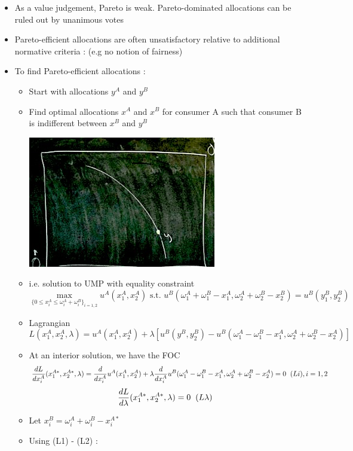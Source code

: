 \documentclass[twoside]{article}
\begin{document}
\begin{itemize}
\item As a value judgement, Pareto is weak. Pareto-dominated allocations can be ruled out by unanimous votes
\item Pareto-efficient allocations are often unsatisfactory relative to additional normative criteria : (e.g no notion of fairness)
\item To find Pareto-efficient allocations :
\begin{itemize}
\item Start with allocations \(y^A\) and \(y^B\)
\item Find optimal allocations \(x^A\) and  \(x^B\) for consumer A such that consumer B is indifferent between \(x^B\) and \(y^B\)
\begin{center}
\includegraphics[scale=0.4]{22}
\end{center}
\item i.e. solution to UMP with equality constraint
\[ \max_{\{0 \leq x_i^A \leq \omega^A_i + \omega^B_i\}_{i=1,2}} u^A(x_1^A, x_2^A) \text{ s.t. } u^B(\omega_1^A + \omega_1^B - x_1^A, \omega_2^A + \omega^B_2 - x_2^B) = u^B(y_1^B, y_2^B)   \]
\item Lagrangian
\[L(x_1^A, x_2^A, \lambda) = u^A(x_1^A, x_2^A) + \lambda [u^B(y^B, y_2^B) - u^B(\omega_1^A - \omega_1^B - x_1^A , \omega_2^A + \omega_2^B - x_2^A)]\]
\item At an interior solution, we have the FOC
\[\frac{dL}{dx_i^A} (x_1^{A*}, x_2^{A*}, \lambda) =  \frac{d}{dx_i^A} u^A(x_1^A, x_2^A) + \lambda \frac{d}{dx_i^A} u^B(\omega_1^A - \omega_1^B - x_1^A , \omega_2^A + \omega_2^B - x_2^A)  = 0 \hspace{0.2cm} (Li), i =1, 2\]
\[\frac{dL}{d \lambda} (x_1^{A*}, x_2^{A*}, \lambda) =  0 \hspace{0.2cm} (L\lambda)\]
\item Let \(x_i^B = \omega^A_i + \omega_i^B - x_i^{A*}\)
\item Using (L1) - (L2) : 

\end{itemize}
\end{itemize}
\end{document}
